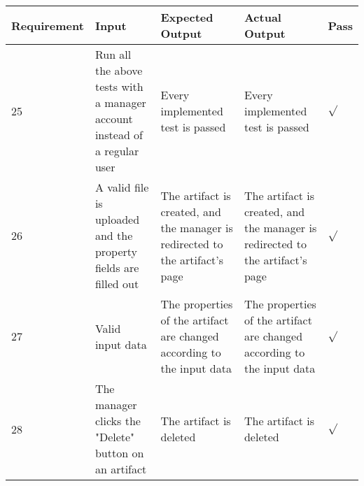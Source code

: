 {\centering
\scalebox{0.7}
{\begin{tabular}{ | p{2cm} | p{3cm} | p{4cm} | p{4cm} | p{0.5cm} | }
	\hline
	Requirement & Input & Expected Output & Actual Output & Pass \\
	\hline
	25 & Run all the above tests with a manager account instead of a regular user & Every implemented test is passed & Every implemented test is passed & $\sqrt{}$ \\
	\hline
	26 & A valid file is uploaded and the property fields are filled out & The artifact is created, and the manager is redirected to the artifact's page & The artifact is created, and the manager is redirected to the artifact's page & $\sqrt{}$ \\
	\hline
	27 & Valid input data & The properties of the artifact are changed according to the input data & The properties of the artifact are changed according to the input data & $\sqrt{}$ \\
	\hline
	28 & The manager clicks the "Delete" button on an artifact & The artifact is deleted & The artifact is deleted & $\sqrt{}$ \\
	\hline
\end{tabular}}}
